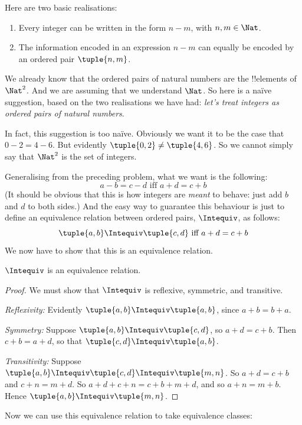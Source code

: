 \documentclass[../../../include/open-logic-section]{subfiles}
\begin{document}

Here are two basic realisations:
	\begin{enumerate}
		\item Every integer can be written in the form $n - m$, with $n, m \in\Nat$.
		\item The information encoded in an expression $n - m$ can equally be encoded by an ordered pair $\tuple{n, m}$.
	\end{enumerate}
We already know that the ordered pairs of natural numbers are the !!{element}s of $\Nat^2$. And we are assuming that we understand $\Nat$. So here is a na\"{i}ve suggestion, based on the two realisations we have had: \emph{let's treat integers as ordered pairs of natural numbers}.

In fact, this suggestion is too na\"{i}ve. Obviously we want it to be the case that $0- 2 = 4 - 6$. But evidently $\tuple{0, 2 }\neq \tuple{4, 6}$. So we cannot simply say that $\Nat^2$ is the set of integers. 

Generalising from the preceding problem, what we want is the following:
	$$a - b = c - d \text{ iff }a + d = c + b$$
(It should be obvious that this is how integers are \emph{meant} to behave: just add $b$ and $d$ to both sides.) And the easy way to guarantee this behaviour is just to define an equivalence relation between ordered pairs, $\Intequiv$, as follows:
$$\tuple{ a, b } \Intequiv \tuple{c, d}\text{ iff }a + d = c + b$$  
We now have to show that this is an equivalence relation.
\begin{prop} $\Intequiv$ is an equivalence relation.
\end{prop}
	\begin{proof}
	We must show that $\Intequiv$ is reflexive, symmetric, and transitive. 
	
	\emph{Reflexivity:} Evidently $\tuple{a, b} \Intequiv \tuple{a, b}$, since $a + b = b + a$.
	
	\emph{Symmetry:} Suppose $\tuple{a, b} \Intequiv \tuple{c, d}$, so $a + d = c + b$. Then $c + b = a + d$, so that $\tuple{c, d} \Intequiv \tuple{a, b}$.
	
	\emph{Transitivity:} Suppose $\tuple{a, b} \Intequiv \tuple{c, d}\Intequiv \tuple{m, n}$. So $a + d = c + b$ and $c + n = m + d$. So $a + d + c + n = c + b + m + d$, and so $a + n = m + b$. Hence $\tuple{a, b } \Intequiv \tuple{m, n}$.		
\end{proof}

Now we can use this equivalence relation to take equivalence classes:
\end{document}
